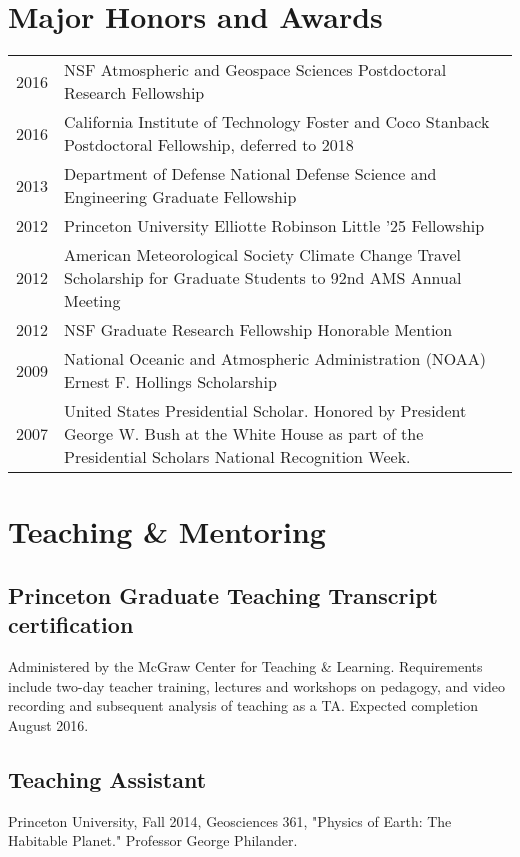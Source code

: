\documentclass{article}
\begin{document}
\section*{Major Honors and Awards}
\label{sec:orgheadline10}
\begin{center}
\begin{tabularx}{\textwidth}{lX}
2016 & NSF Atmospheric and Geospace Sciences Postdoctoral Research Fellowship\\
2016 & California Institute of Technology Foster and Coco Stanback Postdoctoral Fellowship, deferred to 2018\\
2013 & Department of Defense National Defense Science and Engineering Graduate Fellowship\\
2012 & Princeton University Elliotte Robinson Little '25 Fellowship\\
2012 & American Meteorological Society Climate Change Travel Scholarship for Graduate Students to 92nd AMS Annual Meeting\\
2012 & NSF Graduate Research Fellowship Honorable Mention\\
2009 & National Oceanic and Atmospheric Administration (NOAA) Ernest F. Hollings Scholarship\\
2007 & United States Presidential Scholar.  Honored by President George W. Bush at the White House as part of the Presidential Scholars National Recognition Week.\\
\end{tabularx}
\end{center}
\section*{Teaching \& Mentoring}
\label{sec:orgheadline14}
\subsection*{Princeton Graduate Teaching Transcript certification}
\label{sec:orgheadline11}
Administered by the McGraw Center for Teaching \& Learning.  Requirements include
two-day teacher training, lectures and workshops on pedagogy, and video recording
and subsequent analysis of teaching as a TA.  Expected completion August 2016.
\subsection*{Teaching Assistant}
\label{sec:orgheadline12}
Princeton University, Fall 2014, Geosciences 361, "Physics of Earth: The
Habitable Planet."  Professor George Philander.
\end{document}
